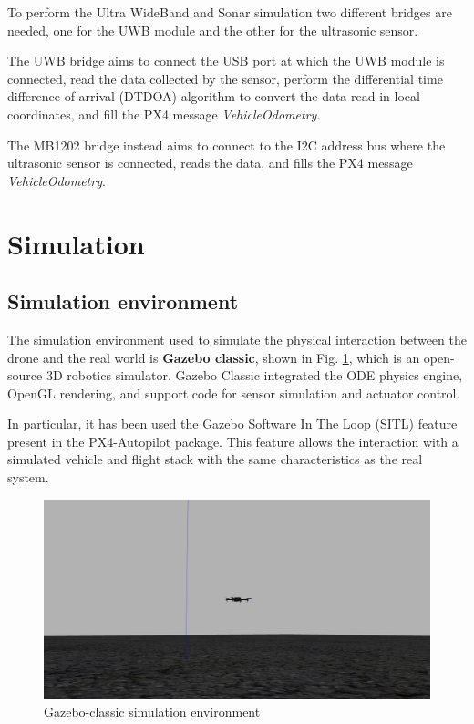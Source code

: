 \documentclass[journal]{IEEEtran}
\begin{document}
To perform the Ultra WideBand and Sonar simulation two different bridges are needed, one for the UWB module and the other for the ultrasonic sensor.

The UWB bridge aims to connect the USB port at which the UWB module is connected, read the data collected by the sensor, perform the differential time difference of arrival (DTDOA) algorithm to convert the data read in local coordinates, and fill the PX4 message \textit{VehicleOdometry}.

The MB1202 bridge instead aims to connect to the I2C address bus where the ultrasonic sensor is connected, reads the data, and fills the PX4 message \textit{VehicleOdometry}.

\section{Simulation} 
\label{simulations}
\subsection{Simulation environment}

The simulation environment used to simulate the physical interaction between the drone and the real world is \textbf{Gazebo classic}, shown in Fig. \ref{fig:Gazebo-classic}, which is an open-source 3D robotics simulator. Gazebo Classic integrated the ODE physics engine, OpenGL rendering, and support code for sensor simulation and actuator control.

In particular, it has been used the Gazebo Software In The Loop (SITL) feature present in the PX4-Autopilot package. This feature allows the interaction with a simulated vehicle and flight stack with the same characteristics as the real system.

\begin{figure}
    \centering
    \includegraphics[scale=0.13]{Images/gzclient_camera.jpg}
    \caption{Gazebo-classic simulation environment}
    \label{fig:Gazebo-classic}
\end{figure}
\end{document}
